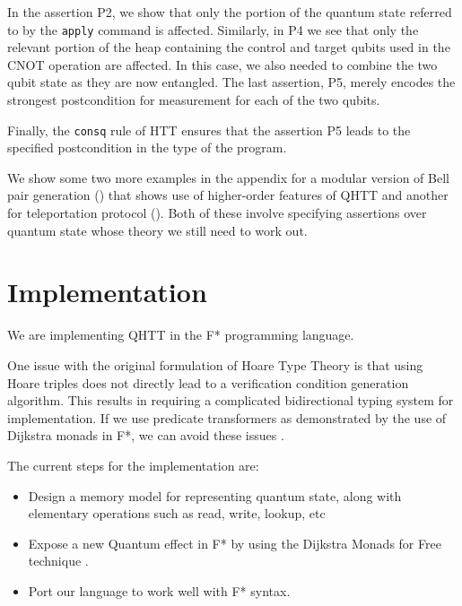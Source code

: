 \documentclass[acmsmall,nonacm,timestamp,review=false,anonymous=false]{acmart}
\begin{document}
In the assertion P2, we show that only the portion of the quantum state referred to by the \texttt{apply} command is affected. Similarly, in P4 we see that only the relevant portion of the heap containing the control and target qubits used in the CNOT operation are affected. In this case, we also needed to combine the two qubit state as they are now entangled. The last assertion, P5, merely encodes the strongest postcondition for measurement for each of the two qubits.

Finally, the \texttt{consq} rule of HTT ensures that the assertion P5 leads to the specified postcondition in the type of the program.

We show some two more examples in the appendix for a modular version of Bell pair generation () that shows use of higher-order features of QHTT and another for teleportation protocol (). Both of these involve specifying assertions over quantum state whose theory we still need to work out.


\section{Implementation}
We are implementing QHTT in the F* programming language.

One issue with the original formulation of Hoare Type Theory is that using Hoare triples does not directly lead to a verification condition generation algorithm. This results in requiring a complicated bidirectional typing system for implementation. If we use predicate transformers as demonstrated by the use of Dijkstra monads in F*, we can avoid these issues \cite{swamy2013verifying}.

The current steps for the implementation are:

\begin{itemize}
	\item Design a memory model for representing quantum state, along with elementary operations such as read, write, lookup, etc
	\item Expose a new Quantum effect in F* by using the Dijkstra Monads for Free technique \cite{dm4free2017}.
	\item Port our language to work well with F* syntax.
\end{itemize}
\end{document}
